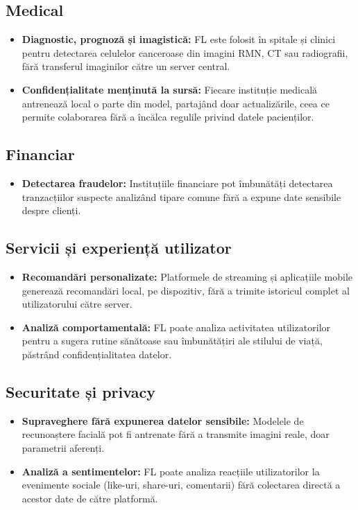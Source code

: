 \documentclass[../../main.tex]{subfiles}
\begin{document}
\subsection*{Medical}
\begin{itemize}
    \item \textbf{Diagnostic, prognoză și imagistică:} FL este folosit în spitale și clinici pentru detectarea celulelor canceroase din imagini RMN, CT sau radiografii, fără transferul imaginilor către un server central.
    \item \textbf{Confidențialitate menținută la sursă:} Fiecare instituție medicală antrenează local o parte din model, partajând doar actualizările, ceea ce permite colaborarea fără a încălca regulile privind datele pacienților.
\end{itemize}

\subsection*{Financiar}
\begin{itemize}
    \item \textbf{Detectarea fraudelor:} Instituțiile financiare pot îmbunătăți detectarea tranzacțiilor suspecte analizând tipare comune fără a expune date sensibile despre clienți.
\end{itemize}

\subsection*{Servicii și experiență utilizator}
\begin{itemize}
    \item \textbf{Recomandări personalizate:} Platformele de streaming și aplicațiile mobile generează recomandări local, pe dispozitiv, fără a trimite istoricul complet al utilizatorului către server.
    \item \textbf{Analiză comportamentală:} FL poate analiza activitatea utilizatorilor pentru a sugera rutine sănătoase sau îmbunătățiri ale stilului de viață, păstrând confidențialitatea datelor.
\end{itemize}

\subsection*{Securitate și privacy}
\begin{itemize}
    \item \textbf{Supraveghere fără expunerea datelor sensibile:} Modelele de recunoaște\-re facială pot fi antrenate fără a transmite imagini reale, doar parametrii aferenți.
    \item \textbf{Analiză a sentimentelor:} FL poate analiza reacțiile utilizatorilor la evenimente sociale (like-uri, share-uri, comentarii) fără colectarea directă a acestor date de către platformă.
\end{itemize}
\end{document}
